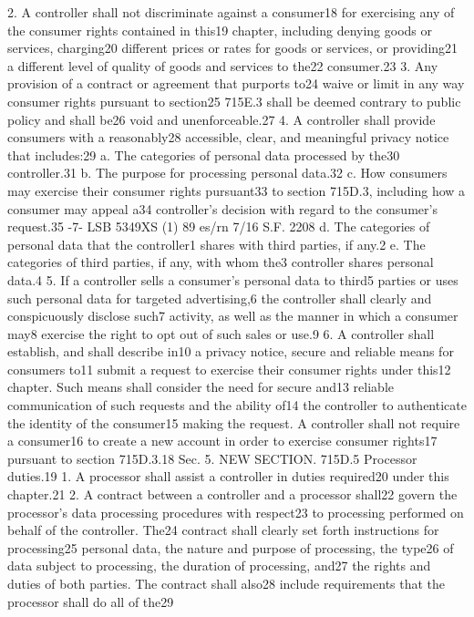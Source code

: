 2. A controller shall not discriminate against a consumer18
for exercising any of the consumer rights contained in this19
chapter, including denying goods or services, charging20
different prices or rates for goods or services, or providing21
a different level of quality of goods and services to the22
consumer.23
3. Any provision of a contract or agreement that purports to24
waive or limit in any way consumer rights pursuant to section25
715E.3 shall be deemed contrary to public policy and shall be26
void and unenforceable.27
4. A controller shall provide consumers with a reasonably28
accessible, clear, and meaningful privacy notice that includes:29
a. The categories of personal data processed by the30
controller.31
b. The purpose for processing personal data.32
c. How consumers may exercise their consumer rights pursuant33
to section 715D.3, including how a consumer may appeal a34
controller’s decision with regard to the consumer’s request.35
-7-
LSB 5349XS (1) 89
es/rn 7/16
S.F. 2208
d. The categories of personal data that the controller1
shares with third parties, if any.2
e. The categories of third parties, if any, with whom the3
controller shares personal data.4
5. If a controller sells a consumer’s personal data to third5
parties or uses such personal data for targeted advertising,6
the controller shall clearly and conspicuously disclose such7
activity, as well as the manner in which a consumer may8
exercise the right to opt out of such sales or use.9
6. A controller shall establish, and shall describe in10
a privacy notice, secure and reliable means for consumers to11
submit a request to exercise their consumer rights under this12
chapter. Such means shall consider the need for secure and13
reliable communication of such requests and the ability of14
the controller to authenticate the identity of the consumer15
making the request. A controller shall not require a consumer16
to create a new account in order to exercise consumer rights17
pursuant to section 715D.3.18
Sec. 5. NEW SECTION. 715D.5 Processor duties.19
1. A processor shall assist a controller in duties required20
under this chapter.21
2. A contract between a controller and a processor shall22
govern the processor’s data processing procedures with respect23
to processing performed on behalf of the controller. The24
contract shall clearly set forth instructions for processing25
personal data, the nature and purpose of processing, the type26
of data subject to processing, the duration of processing, and27
the rights and duties of both parties. The contract shall also28
include requirements that the processor shall do all of the29
